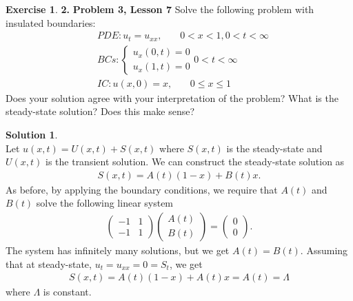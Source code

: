 \documentclass{article}
\theoremstyle{definition}
\newtheorem*{exer*}{Exercise}
\newtheorem*{sln*}{Solution}
\begin{document}
\begin{exer*}\textbf{2. }\textbf{Problem 3, Lesson 7}
	Solve the following problem with insulated boundaries:
	\begin{align*}
	&PDE: u_t = u_{xx},\,\,\,\,\,\,\,\,\,\,\, 0<x<1, 0<t<\infty\\
	&BCs:  
	\begin{cases}
	u_x(0,t) = 0\\
	u_x(1,t) = 0
	\end{cases} 0 < t < \infty\\
	&IC: u(x,0) = x,\,\,\,\,\,\,\,\,\,\,\, 0 \leq x\leq 1
	\end{align*}
	Does your solution agree with your interpretation of the problem? What is the steady-state solution? Does this make sense? 
	\begin{sln*}
		$\,$\\
		
		Let $u(x,t) = U(x,t) + S(x,t)$ where $S(x,t)$ is the steady-state and $U(x,t)$ is the transient solution. We can construct the steady-state solution as
		\begin{align*}
		S(x,t) = A(t)\left(1 -x \right) + B(t)x.
		\end{align*}
		As before, by applying the boundary conditions, we require that $A(t)$ and $B(t)$ solve the following linear system
		\begin{align*}
		\begin{pmatrix}
		-1 & 1\\
		-1 & 1
		\end{pmatrix}
		\begin{pmatrix}
		A(t) \\ B(t)
		\end{pmatrix}
		=
		\begin{pmatrix}
		0\\0
		\end{pmatrix}.
		\end{align*}
		The system has infinitely many solutions, but we get $A(t) = B(t)$. Assuming that at steady-state, $u_t = u_{xx} = 0 = S_t$, we get
		\begin{align*}
		S(x,t) = A(t)(1-x) + A(t)x = A(t) = \Lambda
		\end{align*}
		where $\Lambda$ is constant.\\
		

\end{sln*}
\end{exer*}
\end{document}

